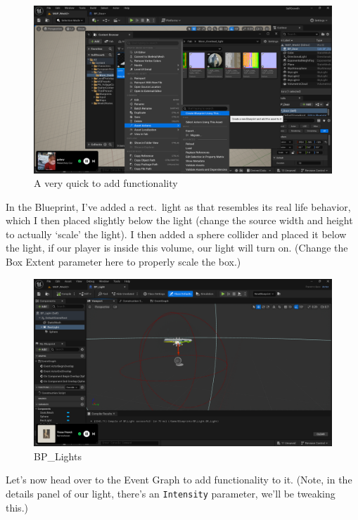 \documentclass[]{article}
\begin{document}
	\begin{figure}[h]
		\centering
		\includegraphics[width=1\linewidth]{week2part2/screenshot013}
		\caption{A very quick to add functionality}
		\label{fig:screenshot013}
	\end{figure}
		\newpage
	In the Blueprint, I've added a rect.\ light as that resembles its real life behavior, which I then placed slightly below the light (change the source width and height to actually `scale' the light). I then added a sphere collider and placed it below the light, if our player is inside this volume, our light will turn on. (Change the Box Extent parameter here to properly scale the box.)
	
	\begin{figure}[h]
		\centering
		\includegraphics[width=1\linewidth]{week2part2/screenshot015}
		\caption{BP\_Lights}
		\label{fig:screenshot015}
	\end{figure}

	Let's now head over to the Event Graph to add functionality to it. (Note, in the details panel of our light, there's an \verb*|Intensity| parameter, we'll be tweaking this.)
	
\end{document}
